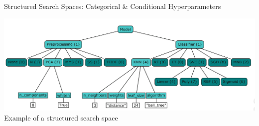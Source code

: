 \begin{frame}[c]{Structured Search Spaces: Categorical \&  Conditional Hyperparameters}
\begin{center}
    \includegraphics[width=.9\linewidth, height=0.9\textheight, keepaspectratio=true]{images/categ_cond_params/Conditional_Parameters_AutoML_Book.png}
    \newline
    Example of a structured search space 
\end{center}
\end{frame}
